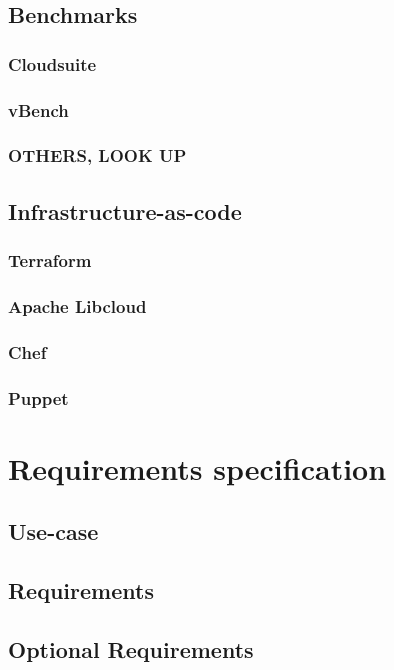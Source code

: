 \documentclass{report}
\begin{document}
\section{Benchmarks}
\subsection{Cloudsuite}
\subsection{vBench}
\subsection{OTHERS, LOOK UP}
\section{Infrastructure-as-code}
\subsection{Terraform}
\subsection{Apache Libcloud}
\subsection{Chef}
\subsection{Puppet}
\chapter{Requirements specification}
\section{Use-case}
\section{Requirements}
\section{Optional Requirements}
\end{document}
